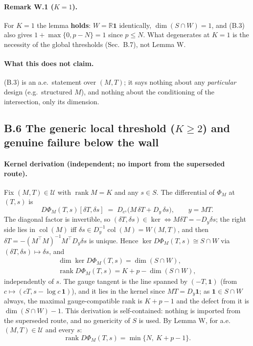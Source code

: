\paragraph{Remark W.1 ($K=1$).} For $K=1$ the lemma \textbf{holds}: $W=\mathbb R\mathbf 1$ identically, $\dim(S\cap W)=1$, and (B.3) also gives $1+\max\{0,p-N\}=1$ since $p\le N$. What degenerates at $K=1$ is the necessity of the global thresholds (Sec.~B.7), not Lemma W.

\paragraph{What this does not claim.} (B.3) is an a.e.\ statement over $(M,T)$; it says nothing about any \emph{particular} design (e.g.\ structured $M$), and nothing about the conditioning of the intersection, only its dimension.

\subsection{B.6 The generic local threshold (\texorpdfstring{$K\ge2$}{K >= 2}) and genuine failure below the wall}

\paragraph{Kernel derivation (independent; no import from the superseded route).} Fix $(M,T)\in\mathcal U$ with $\operatorname{rank}M=K$ and any $s\in S$. The differential of $\Phi_M$ at $(T,s)$ is
\begin{equation}
D\Phi_M(T,s)[\delta T,\delta s]\;=\;D_{e^{s}}\bigl(M\,\delta T+D_y\,\delta s\bigr),\qquad y=MT.
\tag{B.4}
\end{equation}
The diagonal factor is invertible, so $(\delta T,\delta s)\in\ker\Leftrightarrow M\delta T=-D_y\delta s$; the right side lies in $\operatorname{col}(M)$ iff $\delta s\in D_y^{-1}\operatorname{col}(M)=W(M,T)$, and then $\delta T=-(M^\top M)^{-1}M^\top D_y\delta s$ is unique. Hence $\ker D\Phi_M(T,s)\cong S\cap W$ via $(\delta T,\delta s)\mapsto\delta s$, and
\[
\begin{gathered}
\dim\ker D\Phi_M(T,s)=\dim(S\cap W),\\
\operatorname{rank}D\Phi_M(T,s)=K+p-\dim(S\cap W),
\end{gathered}
\]
independently of $s$. The gauge tangent is the line spanned by $(-T,\mathbf 1)$ (from $c\mapsto(cT,s-\log c\,\mathbf 1)$), and it lies in the kernel since $MT=D_y\mathbf 1$; as $\mathbf 1\in S\cap W$ always, the maximal gauge-compatible rank is $K+p-1$ and the defect from it is $\dim(S\cap W)-1$. This derivation is self-contained: nothing is imported from the superseded route, and no genericity of $S$ is used. By Lemma W, for a.e.\ $(M,T)\in\mathcal U$ and every $s$:
\[
\operatorname{rank}D\Phi_M(T,s)=\min\{N,\ K+p-1\}.
\]

